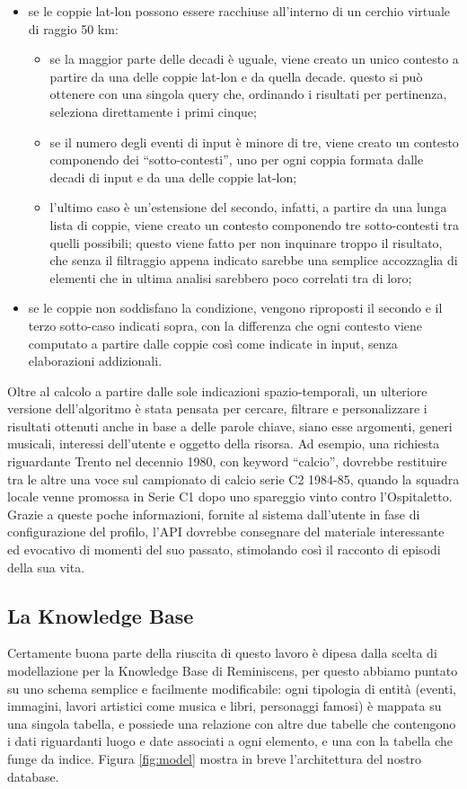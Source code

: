 \documentclass[sigproc-sp.tex]{subfiles}
\begin{document}
\begin{itemize}
\item se le coppie lat-lon possono essere racchiuse all’interno di un cerchio virtuale di raggio 50 km:
\begin{itemize}
\item se la maggior parte delle decadi è uguale, viene creato un unico contesto a partire da una delle coppie lat-lon e da quella decade. questo si può ottenere con una singola query che, ordinando i risultati per pertinenza, seleziona direttamente i primi cinque;
\item se il numero degli eventi di input è minore di tre, viene creato un contesto componendo dei “sotto-contesti”, uno per ogni coppia formata dalle decadi di input e da una delle coppie lat-lon;
\item l’ultimo caso è un’estensione del secondo, infatti, a partire da una lunga lista di coppie, viene creato un contesto componendo tre sotto-contesti tra quelli possibili; questo viene fatto per non inquinare troppo il risultato, che senza il filtraggio appena indicato sarebbe una semplice accozzaglia di elementi che in ultima analisi sarebbero poco correlati tra di loro;
\end{itemize}
\item se le coppie non soddisfano la condizione, vengono riproposti il secondo e il terzo sotto-caso indicati sopra, con la differenza che ogni contesto viene computato a partire dalle coppie così come indicate in input, senza elaborazioni addizionali.
\end{itemize}

Oltre al calcolo a partire dalle sole indicazioni spazio-temporali, un ulteriore versione dell’algoritmo è stata pensata per cercare, filtrare e personalizzare i risultati ottenuti anche in base a delle parole chiave, siano esse argomenti, generi musicali, interessi dell’utente e oggetto della risorsa. Ad esempio, una richiesta riguardante Trento nel decennio 1980, con keyword “calcio”, dovrebbe restituire tra le altre una voce sul campionato di calcio serie C2 1984-85, quando la squadra locale venne promossa in Serie C1 dopo uno spareggio vinto contro l'Ospitaletto.
Grazie a queste poche informazioni, fornite al sistema dall’utente in fase di configurazione del profilo, l’API dovrebbe consegnare del materiale interessante ed evocativo di momenti del suo passato, stimolando così il racconto di episodi della sua vita.

\subsection{La Knowledge Base}
Certamente buona parte della riuscita di questo lavoro è dipesa dalla scelta di modellazione per la Knowledge Base di Reminiscens, per questo abbiamo puntato su uno schema semplice e facilmente modificabile: ogni tipologia di entità (eventi, immagini, lavori artistici come musica e libri, personaggi famosi) è mappata su una singola tabella, e possiede una relazione con altre due tabelle che contengono i dati riguardanti luogo e date associati a ogni elemento, e una con la tabella che funge da indice. Figura \ref{fig:model} mostra in breve l'architettura del nostro database.
\end{document}
